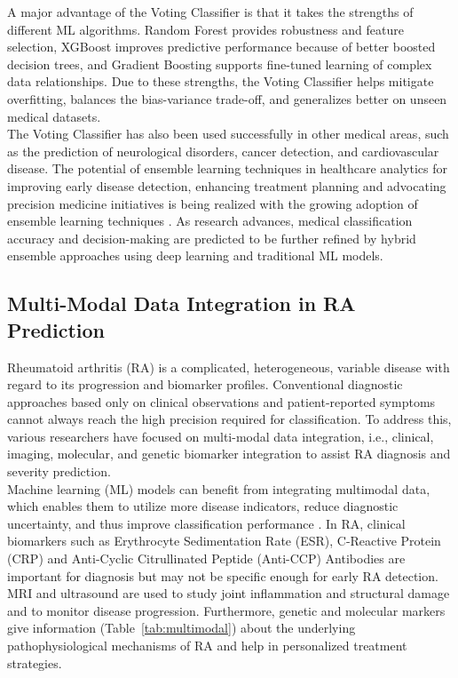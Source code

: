 \documentclass[10pt]{NSP1}
\begin{document}
	A major advantage of the Voting Classifier is that it takes the strengths of different ML algorithms. Random Forest provides robustness and feature selection, XGBoost improves predictive performance because of better boosted decision trees, and Gradient Boosting supports fine-tuned learning of complex data relationships. Due to these strengths, the Voting Classifier helps mitigate overfitting, balances the bias-variance trade-off, and generalizes better on unseen medical datasets.\\
	The Voting Classifier has also been used successfully in other medical areas, such as the prediction of neurological disorders, cancer detection, and cardiovascular disease. The potential of ensemble learning techniques in healthcare analytics for improving early disease detection, enhancing treatment planning and advocating precision medicine initiatives is being realized with the growing adoption of ensemble learning techniques \cite{islam2021deep}. As research advances, medical classification accuracy and decision-making are predicted to be further refined by hybrid ensemble approaches using deep learning and traditional ML models.
	
	\subsection{Multi-Modal Data Integration in RA Prediction}
	Rheumatoid arthritis (RA) is a complicated, heterogeneous, variable disease with regard to its progression and biomarker profiles. Conventional diagnostic approaches based only on clinical observations and patient-reported symptoms cannot always reach the high precision required for classification. To address this, various researchers have focused on multi-modal data integration, i.e., clinical, imaging, molecular, and genetic biomarker integration to assist RA diagnosis and severity prediction.\\
	Machine learning (ML) models can benefit from integrating multimodal data, which enables them to utilize more disease indicators, reduce diagnostic uncertainty, and thus improve classification performance \cite{tang2023comparative}. In RA, clinical biomarkers such as Erythrocyte Sedimentation Rate (ESR), C-Reactive Protein (CRP) and Anti-Cyclic Citrullinated Peptide (Anti-CCP) Antibodies are important for diagnosis but may not be specific enough for early RA detection. MRI and ultrasound are used to study joint inflammation and structural damage and to monitor disease progression. Furthermore, genetic and molecular markers give information (Table~\ref{tab:multimodal}) about the underlying pathophysiological mechanisms of RA and help in personalized treatment strategies.
	
\end{document}
